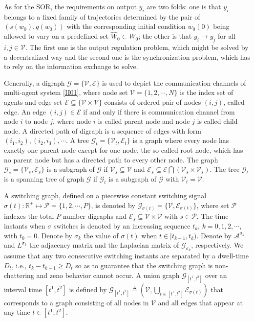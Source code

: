 \documentclass[onecolumn,a4paper,12pt]{article}
\newcommand{\real}{\mathbb{R}}
\numberwithin{equation}{section}
\begin{document}
As for the SOR, the requirements on output $y_i$ are two folds: one is that $y_i$ belongs to a fixed family of trajectories determined by the pair of $(s(w_0), q(w_0))$ with the corresponding initial condition $w_0(0)$ being allowed to vary on a predefined set $\hat{W}_0\subset W_0$; the other is that $y_i\rightarrow y_j$ for all $i,j\in\mathcal{V}$.  The first one is the output regulation problem, which might be solved by a decentralized way and the second one is the synchronization problem, which has to rely on the information exchange to solve.

Generally, a digraph $\mathcal{G}=\{\mathcal{V},\mathcal{E}\}$ is used to depict the communication channels of multi-agent system \eqref{II01}, where node set $\mathcal{V}=\{1,2,\cdots,N\}$ is the index set of agents and edge set $\mathcal{E}\subseteq \{\mathcal{V}\times \mathcal{V}\}$ consists of ordered pair of nodes $(i,j)$, called edge. An edge $(i,j)\in\mathcal{E}$ if and only if there is communication channel from node $i$ to node $j$, where node $i$ is called parent node and node $j$ is called child node. A directed path of digraph is a sequence of edges with form $(i_1,i_2), (i_2,i_3), \cdots$. A tree $\mathcal{G}_t=\{\mathcal{V}_t,\mathcal{E}_t\}$ is a graph where every node has exactly one parent node except for one node, the so-called root node, which has no parent node but has a directed path to every other node. The graph $\mathcal{G}_s=\{\mathcal{V}_s,\mathcal{E}_s\}$ is a subgraph of $\mathcal{G}$ if $\mathcal{V}_s\subseteq\mathcal{V}$ and $\mathcal{E}_s\subseteq \mathcal{E}\bigcap(\mathcal{V}_s\times \mathcal{V}_s)$. The tree $\mathcal{G}_t$ is a spanning tree of graph $\mathcal{G}$ if $\mathcal{G}_t$ is a subgraph of $\mathcal{G}$ with $\mathcal{V}_t=\mathcal{V}$.

A switching graph, defined on a piecewise constant switching signal $\sigma(t):\real^+\mapsto \mathcal{P}=\{1,2,\cdots,P\}$, is denoted by $\mathcal{G}_{\sigma(t)}=\{\mathcal{V},\mathcal{E}_{\sigma(t)}\}$, where set $\mathcal{P}$ indexes the total $P$ number digraphs and $\mathcal{E}_{s}\subseteq\mathcal{V}\times \mathcal{V}$ with $s\in\mathcal{P}$. The time instants when $\sigma$ switches is denoted by an increasing sequence $t_k$, $k=0,1,2,\cdots,$ with $t_0=0$. Denote by $\sigma_k$ the value of $\sigma(t)$ when $t\in[t_{k-1},t_k)$. Denote by $\mathcal{A}^{\sigma_k}$ and $L^{\sigma_k}$ the adjacency matrix and the Laplacian matrix of $\mathcal{G}_{\sigma_k}$, respectively. We assume that any two consecutive switching instants are separated by a dwell-time $D_t$, i.e., $t_k-t_{k-1}\ge D_t$ so as to guarantee that the switching graph is non-chattering and zeno behavior cannot occur. A union graph $\mathcal{G}_{[t^1,t^2]}$ over an interval time $[t^1, t^2]$ is defined by $\mathcal{G}_{[t^1,t^2]}\triangleq (\mathcal{V}, \bigcup_{t\in[t^1,t^2]}\mathcal{E}_{\sigma(t)})$ that corresponds to a graph consisting of all nodes in $\mathcal{V}$ and all edges that appear at any time $t\in[t^1,t^2]$.
\end{document}
